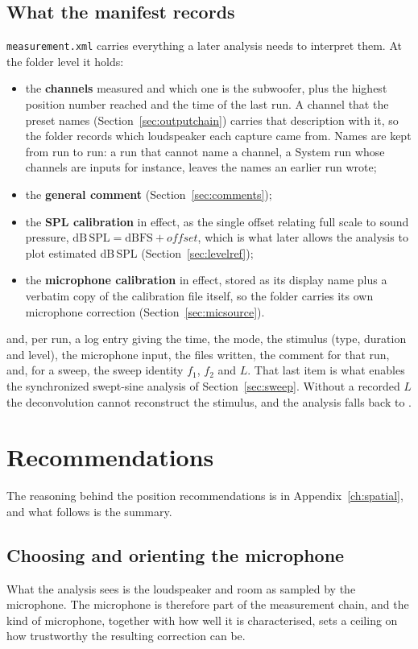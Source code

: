 \subsection{What the manifest records}\label{sec:manifest}
\texttt{measurement.xml} carries everything a later analysis needs to interpret them. At the folder level it holds:

\begin{itemize}[nosep]
  \item the \textbf{channels} measured and which one is the subwoofer, plus the highest position number reached and the time of the last run. A channel that the preset names (Section~\ref{sec:outputchain}) carries that description with it, so the folder records which loudspeaker each capture came from. Names are kept from run to run: a run that cannot name a channel, a System run whose channels are inputs for instance, leaves the names an earlier run wrote;
  \item the \textbf{general comment} (Section~\ref{sec:comments});
  \item the \textbf{SPL calibration} in effect, as the single offset relating full scale to sound pressure, $\mathrm{dB\,SPL} = \mathrm{dBFS} + \textit{offset}$, which is what later allows the analysis to plot estimated dB\,SPL (Section~\ref{sec:levelref});
  \item the \textbf{microphone calibration} in effect, stored as its display name plus a verbatim copy of the calibration file itself, so the folder carries its own microphone correction (Section~\ref{sec:micsource}).
\end{itemize}

\noindent and, per run, a log entry giving the time, the mode, the stimulus (type, duration and level), the microphone input, the files written, the comment for that run, and, for a sweep, the sweep identity $f_1$, $f_2$ and $L$. That last item is what enables the synchronized swept-sine analysis of Section~\ref{sec:sweep}. Without a recorded $L$ the deconvolution cannot reconstruct the stimulus, and the analysis falls back to .

\section{Recommendations}\label{sec:measrec}
The reasoning behind the position recommendations is in Appendix~\ref{ch:spatial}, and what follows is the summary.

\subsection{Choosing and orienting the microphone}\label{sec:micchoice}
What the analysis sees is the loudspeaker and room as sampled by the microphone. The microphone is therefore part of the measurement chain, and the kind of microphone, together with how well it is characterised, sets a ceiling on how trustworthy the resulting correction can be.

